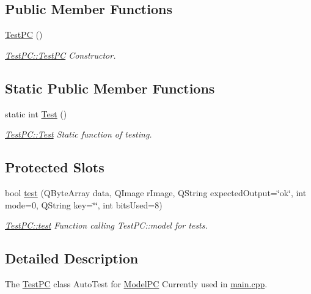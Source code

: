 \subsection*{Public Member Functions}
\begin{DoxyCompactItemize}
\item 
\hyperlink{class_test_p_c_a65226eb54f1ff76639c9fb1e2013e430}{Test\-P\-C} ()
\begin{DoxyCompactList}\small\item\em \hyperlink{class_test_p_c_a65226eb54f1ff76639c9fb1e2013e430}{Test\-P\-C\-::\-Test\-P\-C} Constructor. \end{DoxyCompactList}\end{DoxyCompactItemize}
\subsection*{Static Public Member Functions}
\begin{DoxyCompactItemize}
\item 
static int \hyperlink{class_test_p_c_adec99ddd8910d45b6aca0a105f44960e}{Test} ()
\begin{DoxyCompactList}\small\item\em \hyperlink{class_test_p_c_adec99ddd8910d45b6aca0a105f44960e}{Test\-P\-C\-::\-Test} Static function of testing. \end{DoxyCompactList}\end{DoxyCompactItemize}
\subsection*{Protected Slots}
\begin{DoxyCompactItemize}
\item 
bool \hyperlink{class_test_p_c_a612a0409006417c6f03e1749bca0d45a}{test} (Q\-Byte\-Array data, Q\-Image r\-Image, Q\-String expected\-Output=\char`\"{}ok\char`\"{}, int mode=0, Q\-String key=\char`\"{}\char`\"{}, int bits\-Used=8)
\begin{DoxyCompactList}\small\item\em \hyperlink{class_test_p_c_a612a0409006417c6f03e1749bca0d45a}{Test\-P\-C\-::test} Function calling Test\-P\-C\-::model for tests. \end{DoxyCompactList}\end{DoxyCompactItemize}


\subsection{Detailed Description}
The \hyperlink{class_test_p_c}{Test\-P\-C} class Auto\-Test for \hyperlink{class_model_p_c}{Model\-P\-C} Currently used in \hyperlink{main_8cpp}{main.\-cpp}. 

